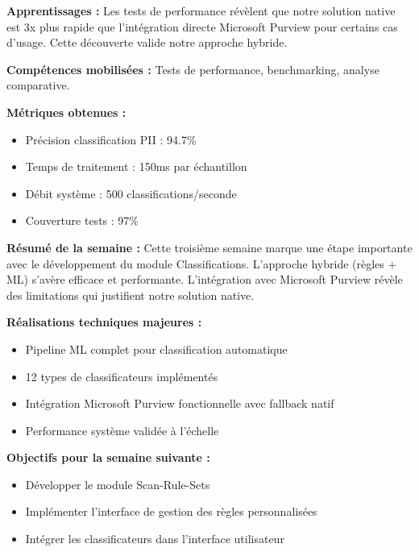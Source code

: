 \textbf{Apprentissages :}
Les tests de performance révèlent que notre solution native est 3x plus rapide que l'intégration directe Microsoft Purview pour certains cas d'usage. Cette découverte valide notre approche hybride.

\textbf{Compétences mobilisées :}
Tests de performance, benchmarking, analyse comparative.

\textbf{Métriques obtenues :}
\begin{itemize}
    \item Précision classification PII : 94.7\%
    \item Temps de traitement : 150ms par échantillon
    \item Débit système : 500 classifications/seconde
    \item Couverture tests : 97\%
\end{itemize}

\textbf{Résumé de la semaine :}
Cette troisième semaine marque une étape importante avec le développement du module Classifications. L'approche hybride (règles + ML) s'avère efficace et performante. L'intégration avec Microsoft Purview révèle des limitations qui justifient notre solution native.

\textbf{Réalisations techniques majeures :}
\begin{itemize}
    \item Pipeline ML complet pour classification automatique
    \item 12 types de classificateurs implémentés
    \item Intégration Microsoft Purview fonctionnelle avec fallback natif
    \item Performance système validée à l'échelle
\end{itemize}

\textbf{Objectifs pour la semaine suivante :}
\begin{itemize}
    \item Développer le module Scan-Rule-Sets
    \item Implémenter l'interface de gestion des règles personnalisées
    \item Intégrer les classificateurs dans l'interface utilisateur
\end{itemize}